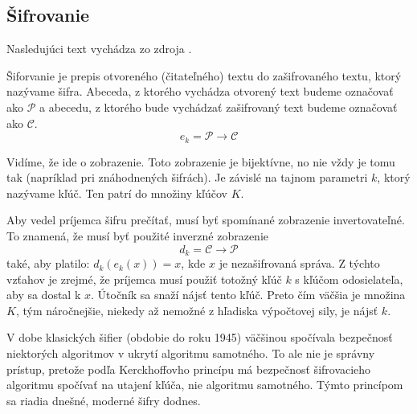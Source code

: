 \subsection{Šifrovanie}
\noindent Nasledujúci text vychádza zo zdroja \cite{ksif}. 

Šiforvanie je prepis otvoreného (čitateľného) textu do zašifrovaného textu, ktorý nazývame šifra. Abeceda, z ktorého vychádza otvorený text budeme označovať ako $\mathcal{P}$ a abecedu, z ktorého bude vychádzať zašifrovaný text budeme označovať ako $\mathcal{C}$.
\begin{equation}
e_k = \mathcal{P} \rightarrow \mathcal{C}
\end{equation}

Vidíme, že ide o zobrazenie. Toto zobrazenie je bijektívne, no nie vždy je tomu tak (napríklad pri znáhodnených šifrách). Je závislé na tajnom parametri $k$, ktorý nazývame kľúč. Ten patrí do množiny kľúčov $K$.

Aby vedel príjemca šifru prečítať, musí byť spomínané zobrazenie invertovateľné. To znamená, že musí byť použité inverzné zobrazenie 
\begin{equation}
d_k = \mathcal{C} \rightarrow \mathcal{P}
\end{equation}
také, aby platilo: $d_k(e_k(x)) = x$, kde $x$ je nezašifrovaná správa. Z týchto vzťahov je zrejmé, že príjemca musí použiť totožný kľúč $k$ s kľúčom odosielateľa, aby sa dostal k $x$. Útočník sa snaží nájsť tento kľúč. Preto čím väčšia je množina $K$, tým náročnejšie, niekedy až nemožné z hľadiska výpočtovej sily, je nájsť $k$.

V dobe klasických šifier (obdobie do roku 1945) väčšinou spočívala bezpečnosť niektorých algoritmov v ukrytí algoritmu samotného. To ale nie je správny prístup, pretože podľa Kerckhoffovho princípu \cite{ksif} má bezpečnosť šifrovacieho algoritmu spočívať na utajení kľúča, nie algoritmu samotného. Týmto princípom sa riadia dnešné, moderné šifry dodnes. 